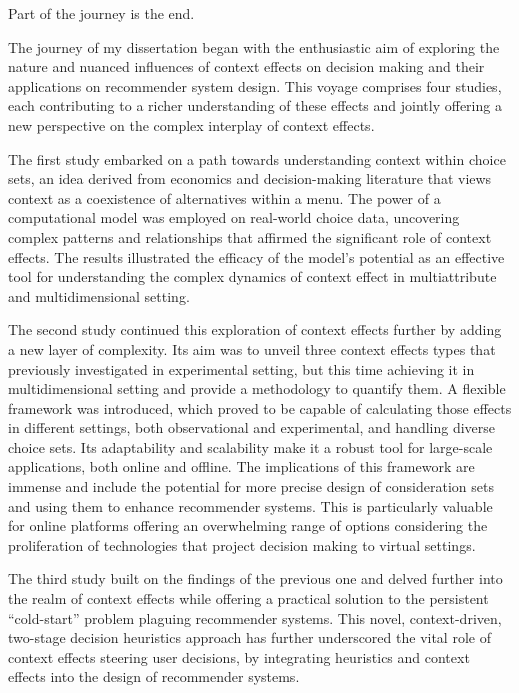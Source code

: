\documentclass[a4paper,12pt]{article}
\begin{document}
\epigraph{Part of the journey is the end.}{}

The journey of my dissertation began with the enthusiastic aim of exploring the nature and nuanced influences of context effects on decision making and their applications on recommender system design. This voyage comprises four studies, each contributing to a richer understanding of these effects and jointly offering a new perspective on the complex interplay of context effects. 

The first study embarked on a path towards understanding context within choice sets, an idea derived from economics and decision-making literature that views context as a coexistence of alternatives within a menu. The power of a computational model was employed on real-world choice data, uncovering complex patterns and relationships that affirmed the significant role of context effects. The results illustrated the efficacy of the model's potential as an effective tool for understanding the complex dynamics of context effect in multiattribute and multidimensional setting.

The second study continued this exploration of context effects further by adding a new layer of complexity. Its aim was to unveil three context effects types that previously investigated in experimental setting, but this time achieving it in multidimensional setting and provide a methodology to quantify them. A flexible framework was introduced, which proved to be capable of calculating those effects in different settings, both observational and experimental, and handling diverse choice sets. Its adaptability and scalability make it a robust tool for large-scale applications, both online and offline. The implications of this framework are immense and include the potential for more precise design of consideration sets and using them to enhance recommender systems. This is particularly valuable for online platforms offering an overwhelming range of options considering the proliferation of technologies that project decision making to virtual settings.

The third study built on the findings of the previous one and delved further into the realm of context effects while offering a practical solution to the persistent ``cold-start'' problem plaguing  recommender systems. This novel, context-driven, two-stage decision heuristics approach has further underscored the vital role of context effects steering user decisions, by integrating heuristics and context effects into the design of recommender systems.
\end{document}
